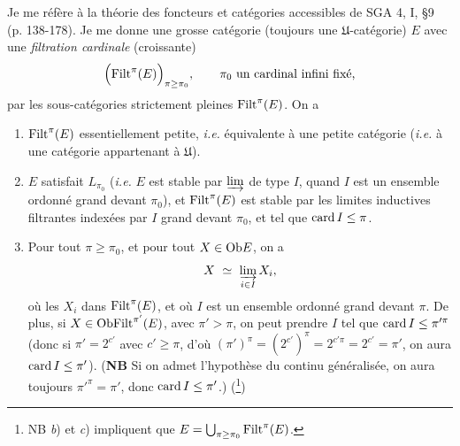 Je me réfère à la théorie des foncteurs et catégories accessibles de SGA 4, I, §9 (p. 138-178). Je me donne une grosse catégorie (toujours une $\mathfrak{U}$-catégorie) $E$ avec une \textit{filtration cardinale} (croissante)
\[
\Bigl(\mathrm{Filt}^{\pi}(E)\Bigr)_{\pi \geq \pi_0}, \qquad \pi_0 \text{ un cardinal infini fixé,}
\]
par les sous-catégories strictement pleines $\mathrm{Filt}^{\pi}(E)$. On a

\begin{enumerate}
\item[\textit{a})] $\mathrm{Filt}^{\pi}(E)$ essentiellement petite, \textit{i.e.} équivalente à une petite catégorie (\textit{i.e.} à une catégorie appartenant à $\mathfrak{U}$).
\item[\textit{b})] $E$ satisfait $L_{\pi_0}$ (\textit{i.e.} $E$ est stable par $\varinjlim$ de type $I$, quand $I$ est un ensemble ordonné grand devant $\pi_0$), et $\mathrm{Filt}^{\pi}(E)$ est stable par les limites inductives filtrantes indexées par $I$ grand devant $\pi_0$, et tel que $\mathrm{card}\, I \leq \pi$.
\item[\textit{c})] Pour tout $\pi \geq \pi_0$, et pour tout $X \in \mathrm{Ob} E$, on a
\[
X \ \simeq\ \varinjlim_{i \in I} X_i,
\]
où les $X_i$ dans $\mathrm{Filt}^{\pi}(E)$, et où $I$ est un ensemble ordonné grand devant $\pi$. De plus, si $X \in \mathrm{Ob} \mathrm{Filt}^{\pi'}(E)$, avec $\pi' > \pi$, on peut prendre $I$ tel que $\mathrm{card}\, I \leq \pi'^{\pi}$ (donc si $\pi' = 2^{c'}$ avec $c' \geq \pi$, d'où $(\pi')^{\pi} = (2^{c'})^{\pi} = 2^{c'\pi} = 2^{c'} = \pi'$, on aura $\mathrm{card}\, I \leq \pi'$). (\textbf{NB} Si on admet l'hypothèse du continu généralisée, on aura toujours $\pi'^{\pi} = \pi'$, donc $\mathrm{card}\, I \leq \pi'$.) (\footnote[39]{NB \textit{b}) et \textit{c}) impliquent que $E = \bigcup_{\pi \geq \pi_0} \mathrm{Filt}^{\pi}(E)$.})
\end{enumerate}


